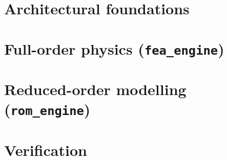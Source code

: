 \documentclass[11pt,a4paper,twoside,openany]{book}
\begin{document}
\mainmatter
\part{Architectural foundations}


\part{Full-order physics (\texttt{fea\_engine})}





\part{Reduced-order modelling (\texttt{rom\_engine})}






\part{Verification}


\appendix





\backmatter
\end{document}
